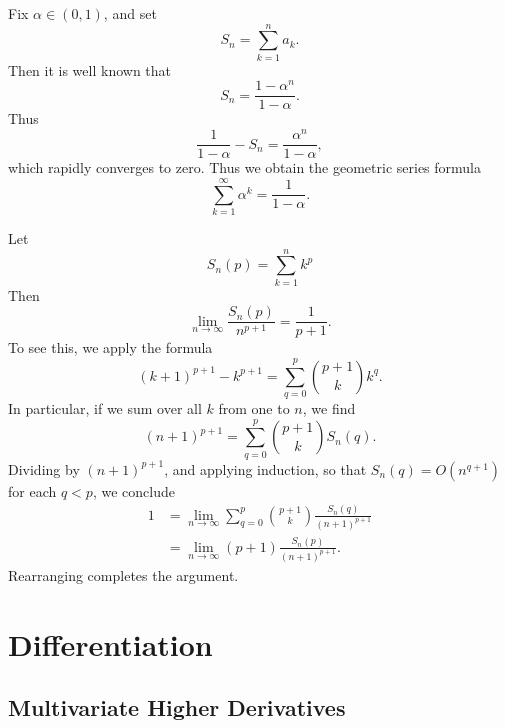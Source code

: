 \begin{example}
    Fix $\alpha \in (0,1)$, and set
    \[ S_n = \sum_{k = 1}^n a_k. \]
    Then it is well known that
    \[ S_n = \frac{1 - \alpha^n}{1 - \alpha}. \]
    Thus
    \[ \frac{1}{1 - \alpha} - S_n = \frac{\alpha^n}{1 - \alpha},  \]
    which rapidly converges to zero. Thus we obtain the geometric series formula
    \[ \sum_{k = 1}^\infty \alpha^k = \frac{1}{1 - \alpha}. \]
\end{example}

\begin{example}
    Let
    \[ S_n(p) = \sum_{k = 1}^n k^p \]
    Then
    \[ \lim_{n \to \infty} \frac{S_n(p)}{n^{p+1}} = \frac{1}{p+1}. \]
    To see this, we apply the formula
    \[ (k + 1)^{p+1} - k^{p+1} = \sum_{q = 0}^p {p+1 \choose k} k^q. \]
    In particular, if we sum over all $k$ from one to $n$, we find
    \[ (n+1)^{p+1} = \sum_{q = 0}^p {p+1 \choose k} S_n(q). \]
    Dividing by $(n+1)^{p+1}$, and applying induction, so that $S_n(q) = O(n^{q+1})$ for each $q < p$, we conclude
    \begin{align*}
        1 &= \lim_{n \to \infty} \sum_{q = 0}^p {p+1 \choose k} \frac{S_n(q)}{(n+1)^{p+1}}\\
        &= \lim_{n \to \infty} (p+1) \frac{S_n(p)}{(n+1)^{p+1}}.
    \end{align*}
    Rearranging completes the argument.
\end{example}


\chapter{Differentiation}

\section{Multivariate Higher Derivatives}

